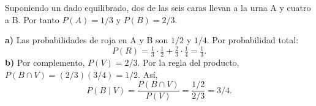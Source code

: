 Suponiendo un dado equilibrado, dos de las seis caras llevan a la urna A y cuatro a B. Por tanto $P(A)=1/3$ y $P(B)=2/3$.

\textbf{a)} Las probabilidades de roja en A y B son $1/2$ y $1/4$. Por probabilidad total:
\[
P(R)=\tfrac13\cdot\tfrac12+\tfrac23\cdot\tfrac14=\boxed{\tfrac13}.
\]
\textbf{b)} Por complemento, $P(V)=2/3$. Por la regla del producto, $P(B\cap V)=(2/3)(3/4)=1/2$. Así,
\[
P(B\mid V)=\frac{P(B\cap V)}{P(V)}=\frac{1/2}{2/3}=\boxed{3/4}.
\]
